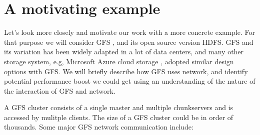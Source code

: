 \section{A motivating example}
\label{section:motivation}

Let's look more closely and motivate our work with a more concrete example. 
For that purpose we will consider GFS \cite{gfs}, and its open source version HDFS. GFS and its variation has been widely adapted in a lot of data centers, and many other storage system, e.g, Microsoft Azure cloud storage \cite{azure-storage}, adopted similar design options with GFS. We will briefly describe how GFS uses network, and identify potential performance boost we could get using an understanding of the nature of the interaction of GFS and network.

A GFS cluster consists of a single master and multiple chunkservers and is accessed by mulitple clients. The size of a GFS cluster could be in order of thousands. Some major GFS network communication include:

